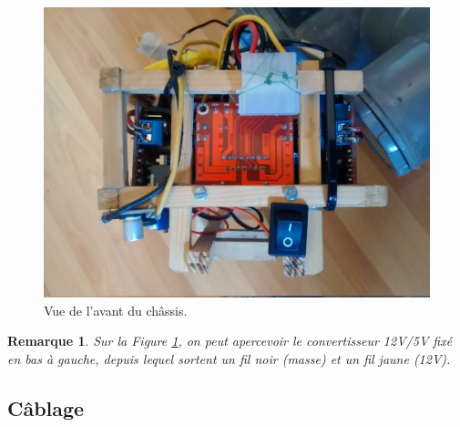 \documentclass[11pt,a4paper]{article}
\newtheorem*{remarque*}{Remarque}
\begin{document}
        \begin{figure}[H]
          \centering
          \includegraphics[scale=0.15]{ROVReelChassisArriere.jpg}
          \caption{Vue de l'avant du châssis.}
          \label{figChassisAvant}
        \end{figure}
        \begin{remarque*}
          Sur la Figure \ref{figChassisAvant}, on peut apercevoir le convertisseur 12V/5V fixé en bas à gauche, depuis lequel sortent un fil noir (masse) et un fil jaune (12V).
        \end{remarque*}


%           

      
      \subsection{Câblage}
        
\end{document}
